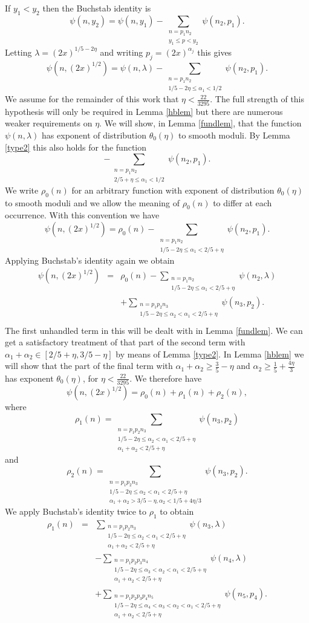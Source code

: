 \documentclass[12pt]{amsart}
\theoremstyle{plain}
\theoremstyle{definition}
\numberwithin{equation}{section}
\def \a{\alpha} \def \b{\beta} \def \d{\delta} \def \e{\varepsilon} \def \g{\gamma} \def \k{\kappa} \def \l{\lambda} \def \s{\sigma} \def \t{\theta} \def \z{\zeta}
\newcommand{\twosum}[2]{\sum_{\substack{#1\\#2}}}
\newcommand{\threesum}[3]{\sum_{\substack{#1\\#2\\#3}}}
\begin{document}
If $y_1<y_2$ then the Buchstab identity is 
$$\psi(n,y_2)=\psi(n,y_1)-\twosum{n=p_1n_2}{y_1\leq p<y_2}\psi(n_2,p_1).$$ 
Letting $\l =(2x)^{1/5-2\eta}$ and writing $p_j=(2x)^{\a_j}$ this gives 
$$\psi(n,(2x)^{1/2})=\psi(n,\l)-\twosum{n=p_1n_2}{1/5-2\eta\leq \a_1< 1/2}\psi(n_2,p_1).$$
We assume for the remainder of this work that $\eta<\frac{22}{3295}$.  The full strength of this hypothesis will only be required in Lemma \ref{hblem} but there are numerous weaker requirements on $\eta$.  We will show, in Lemma \ref{fundlem}, that the function $\psi(n,\l)$ has exponent of distribution $\theta_0(\eta)$ to smooth moduli.  By Lemma \ref{type2} this also holds for the function 
$$-\twosum{n=p_1n_2}{2/5+\eta\leq \a_1< 1/2}\psi(n_2,p_1).$$
We write $\rho_0(n)$ for an arbitrary  function with exponent of distribution $\theta_0(\eta)$ to smooth moduli and we allow the meaning of $\rho_0(n)$ to differ at each occurrence.  With this convention we have 
$$\psi(n,(2x)^{1/2})=\rho_0(n)-\twosum{n=p_1n_2}{1/5-2\eta\leq \a_1< 2/5+\eta}\psi(n_2,p_1).$$
Applying Buchstab's identity again we obtain 
\begin{eqnarray*}
\psi(n,(2x)^{1/2})&=&\rho_0(n)-\twosum{n=p_1n_2}{1/5-2\eta\leq \a_1< 2/5+\eta}\psi(n_2,\l)\\
&&+\twosum{n=p_1p_2n_3}{1/5-2\eta\leq \a_2<\a_1< 2/5+\eta}\psi(n_3,p_2).\\
\end{eqnarray*}
The first unhandled term in this will be dealt with in Lemma \ref{fundlem}.  We can get a satisfactory treatment of that part of the second term with $\a_1+\a_2\in [2/5+\eta,3/5-\eta]$ by means of Lemma \ref{type2}.  In Lemma \ref{hblem} we will show that the part of the final term with $\a_1+\a_2\geq \frac35-\eta$ and $\a_2\geq \frac15+\frac{4\eta}{3}$ has exponent $\theta_0(\eta)$, for $\eta<\frac{22}{3295}$.  We therefore have 
$$\psi(n,(2x)^{1/2})=\rho_0(n)+\rho_1(n)+\rho_2(n),$$
where
$$\rho_1(n)=\threesum{n=p_1p_2n_3}{1/5-2\eta\leq \a_2<\a_1< 2/5+\eta}{\a_1+\a_2<2/5+\eta}\psi(n_3,p_2)$$
and
$$\rho_2(n)=\threesum{n=p_1p_2n_3}{1/5-2\eta\leq \a_2<\a_1< 2/5+\eta}{\a_1+\a_2>3/5-\eta,\a_2<1/5+4\eta/3}\psi(n_3,p_2).$$
We apply Buchstab's identity twice to $\rho_1$ to obtain 
\begin{eqnarray*}
\rho_1(n)&=&\threesum{n=p_1p_2n_3}{1/5-2\eta\leq \a_2<\a_1< 2/5+\eta}{\a_1+\a_2<2/5+\eta}\psi(n_3,\l)\\
&&-\threesum{n=p_1p_2p_3n_4}{1/5-2\eta\leq \a_3<\a_2<\a_1< 2/5+\eta}{\a_1+\a_2<2/5+\eta}\psi(n_4,\l)\\
&&+\threesum{n=p_1p_2p_3p_4n_5}{1/5-2\eta\leq \a_4<\a_3<\a_2<\a_1< 2/5+\eta}{\a_1+\a_2<2/5+\eta}\psi(n_5,p_4).
\end{eqnarray*}
\end{document}
